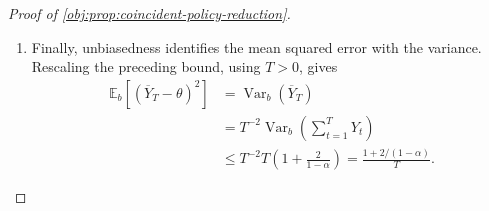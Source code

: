 \begin{proof}[Proof of \cref{obj:prop:coincident-policy-reduction}]
\begin{enumerate}
To bound each covariance row, first use the finite geometric identity
\[
(1-\alpha)\sum_{\ell=0}^{T-1}\alpha^\ell
=
1-\alpha^T
\leq1,
\qquad
\sum_{\ell=0}^{T-1}\alpha^\ell
\leq\frac1{1-\alpha}.
\]
Here \(\ell\) is a nonnegative integer exponent. For fixed \(t\), the exponent maps \(u\mapsto t-u-1\) on \(1\leq u<t\) and \(u\mapsto u-t-1\) on \(t<u\leq T\) are injective and take values in \(\{0,\ldots,T-1\}\). Because all powers of \(\alpha\) are nonnegative, symmetry of covariance gives
\[
\begin{aligned}
\sum_{u=1}^{t-1}\operatorname{Cov}_b(Y_t,Y_u)
&=
\sum_{u=1}^{t-1}\operatorname{Cov}_b(Y_u,Y_t)
\leq
\sum_{u=1}^{t-1}\alpha^{t-u-1}
\leq
\sum_{\ell=0}^{T-1}\alpha^\ell
\leq\frac1{1-\alpha},\\
\sum_{u=t+1}^{T}\operatorname{Cov}_b(Y_t,Y_u)
&\leq
\sum_{u=t+1}^{T}\alpha^{u-t-1}
\leq
\sum_{\ell=0}^{T-1}\alpha^\ell
\leq\frac1{1-\alpha}.
\end{aligned}
\]
These inequalities include the empty past or future ranges at the endpoints. Splitting the row into its diagonal, past, and future parts now yields
\[
\begin{aligned}
\sum_{u=1}^{T}\operatorname{Cov}_b(Y_t,Y_u)
&=
\operatorname{Cov}_b(Y_t,Y_t)
+\sum_{u=1}^{t-1}\operatorname{Cov}_b(Y_t,Y_u)
+\sum_{u=t+1}^{T}\operatorname{Cov}_b(Y_t,Y_u)\\
&\leq1+\frac2{1-\alpha}.
\end{aligned}
\]
Summing over \(t\) proves
\[
\operatorname{Var}_b\!\left(\sum_{t=1}^{T}Y_t\right)
\leq
T\left(1+\frac2{1-\alpha}\right).
\]

\item Finally, unbiasedness identifies the mean squared error with the variance. Rescaling the preceding bound, using \(T>0\), gives
\[
\begin{aligned}
\mathbb E_b\!\left[(\overline Y_T-\theta)^2\right]
&=
\operatorname{Var}_b(\overline Y_T)\\
&=
T^{-2}\operatorname{Var}_b\!\left(\sum_{t=1}^{T}Y_t\right)\\
&\leq
T^{-2}T\left(1+\frac2{1-\alpha}\right)
=
\frac{1+2/(1-\alpha)}{T}.
\end{aligned}
\]
\end{enumerate}
\end{proof}

